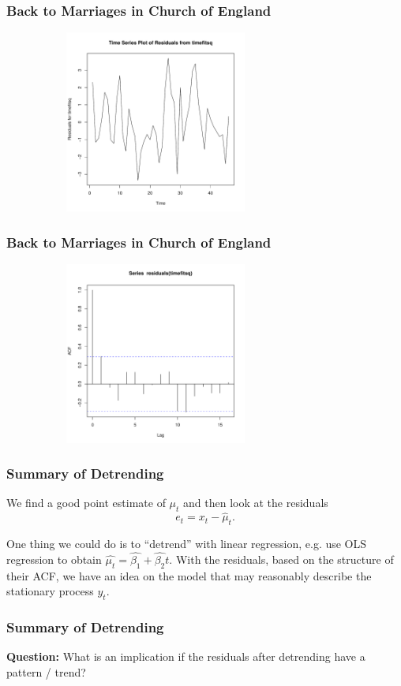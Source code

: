 \documentclass[%
xcolor=pdftex]{beamer}
\begin{document}
\begin{frame}
\frametitle{Back to Marriages in Church of England}

\includegraphics[width=100mm, height=60mm]{pics/restimefitsq.pdf}

\end{frame}

\begin{frame}
\frametitle{Back to Marriages in Church of England}

\includegraphics[width=100mm, height=60mm]{pics/acftimefitsq.pdf}

\end{frame}

\begin{frame}
\frametitle{Summary of Detrending}

We find a good point estimate of $\mu_t$ and then look at the residuals
$$
e_t=x_t-\hat{\mu}_t.
$$

One thing we could do is to ``detrend'' with linear regression, e.g. use OLS regression to obtain $\hat{\mu_t} = \hat{\beta_1} + \hat{\beta_2} t$. With the residuals, based on the structure of their ACF, we have an idea on the model that may reasonably describe the stationary process $y_t$.

\end{frame}

\begin{frame}
\frametitle{Summary of Detrending}

\textbf{Question:} What is an implication if the residuals after detrending have a pattern / trend?

\vspace{50mm}

\end{frame}
\end{document}
